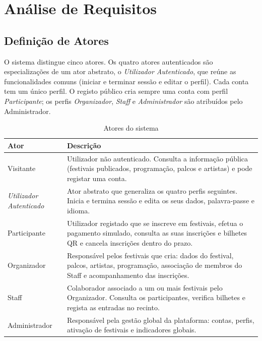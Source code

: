 \chapter{Análise de Requisitos}

\section{Definição de Atores}

O sistema distingue cinco atores. Os quatro atores autenticados são
especializações de um ator abstrato, o \emph{Utilizador Autenticado}, que
reúne as funcionalidades comuns (iniciar e terminar sessão e editar o perfil).
Cada conta tem um único perfil. O registo público cria sempre uma conta com
perfil \emph{Participante}; os perfis \emph{Organizador}, \emph{Staff} e
\emph{Administrador} são atribuídos pelo Administrador.

\begin{table}[H]
\centering
\caption{Atores do sistema}
\label{tab:atores}
\begin{tabularx}{\textwidth}{|l|X|}
\hline
\textbf{Ator} & \textbf{Descrição} \\ \hline
Visitante & Utilizador não autenticado. Consulta a informação pública
  (festivais publicados, programação, palcos e artistas) e pode registar uma
  conta. \\ \hline
\emph{Utilizador Autenticado} & Ator abstrato que generaliza os quatro perfis
  seguintes. Inicia e termina sessão e edita os seus dados, palavra-passe e
  idioma. \\ \hline
Participante & Utilizador registado que se inscreve em festivais, efetua o
  pagamento simulado, consulta as suas inscrições e bilhetes QR e cancela
  inscrições dentro do prazo. \\ \hline
Organizador & Responsável pelos festivais que cria: dados do festival, palcos,
  artistas, programação, associação de membros do Staff e acompanhamento das
  inscrições. \\ \hline
Staff & Colaborador associado a um ou mais festivais pelo Organizador.
  Consulta os participantes, verifica bilhetes e regista as entradas no
  recinto. \\ \hline
Administrador & Responsável pela gestão global da plataforma: contas,
  perfis, ativação de festivais e indicadores globais. \\ \hline
\end{tabularx}
\end{table}

